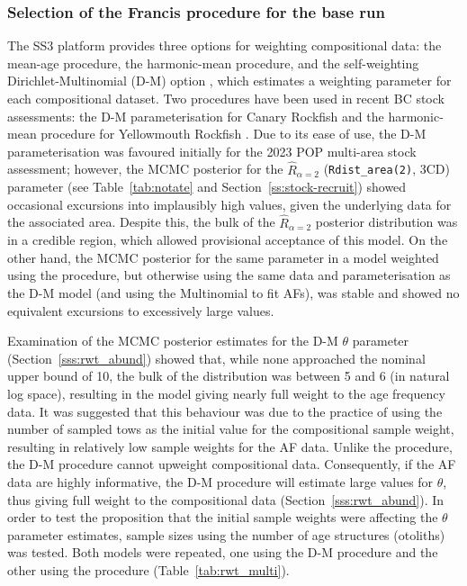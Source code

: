 \documentclass[11pt]{book}
\newcommand{\code}[1]{\normalsize\texttt{#1}\normalsize}%
\begin{document}
\subsubsection{Selection of the Francis procedure for the base run} \label{sss:rwt_select}

The SS3 platform provides three options for weighting compositional data: the \citet{Francis:2011} mean-age procedure, the \citet{McAllister-Ianelli:1997} harmonic-mean procedure, and the self-weighting Dirichlet-Multinomial (D-M) option \citep{Thorson-etal:2017}, which estimates a weighting parameter for each compositional dataset.
Two procedures have been used in recent BC stock assessments: the D-M parameterisation for Canary Rockfish \citep{Starr-Haigh:2023_car} and the \citet{McAllister-Ianelli:1997} harmonic-mean procedure for Yellowmouth Rockfish \citep{Starr-Haigh:2022_ymr}.
Due to its ease of use, the D-M parameterisation was favoured initially for the 2023 POP multi-area stock assessment; however, the MCMC posterior for the $\widehat{R}_{\alpha=2}$ (\code{Rdist\_area(2)}, 3CD) parameter (see Table~\ref{tab:notate} and Section~\ref{ss:stock-recruit}) showed occasional excursions into implausibly high values, given the underlying data for the associated area.
Despite this, the bulk of the $\widehat{R}_{\alpha=2}$ posterior distribution was in a credible region, which allowed provisional acceptance of this model. 
On the other hand, the MCMC posterior for the same parameter in a model weighted using the \citet{Francis:2011} procedure, but otherwise using the same data and parameterisation as the D-M model (and using the Multinomial to fit AFs), was stable and showed no equivalent excursions to excessively large values.

Examination of the MCMC posterior estimates for the D-M $\theta$ parameter (Section~\ref{sss:rwt_abund}) showed that, while none approached the nominal upper bound of 10, the bulk of the distribution was between 5 and 6 (in natural log space), resulting in the model giving nearly full weight to the age frequency data.
It was suggested that this behaviour was due to the practice of using the number of sampled tows as the initial value for the compositional sample weight, resulting in relatively low sample weights for the AF data.
Unlike the \citet{Francis:2011} procedure, the D-M procedure cannot upweight compositional data. 
Consequently, if the AF data are highly informative, the D-M procedure will estimate large values for $\theta$, thus giving full weight to the compositional data (Section~\ref{sss:rwt_abund}). 
In order to test the proposition that the initial sample weights were affecting the $\theta$ parameter estimates, sample sizes using the number of age structures (otoliths) was tested. 
Both models were repeated, one using the D-M procedure and the other using the \cite{Francis:2011} procedure (Table~\ref{tab:rwt_multi}).
\end{document}
